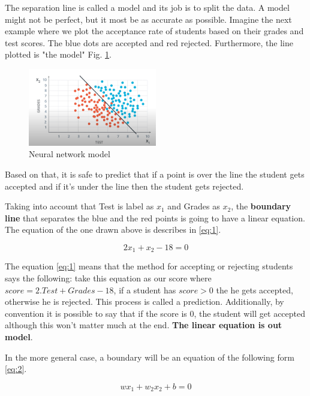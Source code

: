 \documentclass{article}
\begin{document}
The separation line is called a model and its job is to split the data. A model might not be perfect, but it most be as accurate as possible. Imagine the next example where we plot the acceptance rate of students based on their grades and test scores. The blue dots are accepted and red rejected. Furthermore, the line plotted is "the model" Fig. \ref{fig:f3}.

\begin{figure}[ht]
    \centering
    \includegraphics[width=0.5\textwidth,height=0.5\textheight,keepaspectratio]{images/example_1.PNG}
    \captionsetup{justification=centering}
    \caption{Neural network model}
    \label{fig:f3}
\end{figure}

Based on that, it is safe to predict that if a point is over the line the student gets accepted and if it's under the line then the student gets rejected.

Taking into account that Test is label as \(x_1\) and Grades as \(x_2\), the \textbf{boundary line} that separates the blue and the red points is going to have a linear equation. The equation of the one drawn above is describes in \eqref{eq:1}.

\begin{equation}
2 x_1 + x_2 - 18 = 0 \label{eq:1}
\end{equation}

The equation \eqref{eq:1} means that the method for accepting or rejecting students says the following: take this equation as our score where \(score =2.Test + Grades - 18\), if a student has \(score > 0\) the he gets accepted, otherwise he is rejected. This process is called a prediction. Additionally, by convention it is possible to say that if the score is 0, the student will get accepted although this won't matter much at the end. \textbf{The linear equation is out model}.

In the more general case, a boundary will be an equation of the following form \eqref{eq:2}.

\begin{equation}
wx_1+w_2x_2+b=0 \label{eq:2}
\end{equation}  
\end{document}
